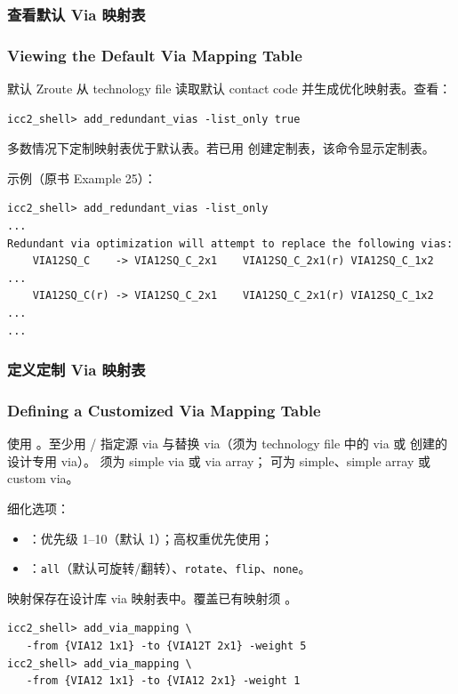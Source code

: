 \subsubsection{查看默认 Via 映射表}
\subsubsection*{Viewing the Default Via Mapping Table}

默认 Zroute 从 technology file 读取默认 contact code 并生成优化映射表。查看：
\begin{lstlisting}
icc2_shell> add_redundant_vias -list_only true
\end{lstlisting}
多数情况下定制映射表优于默认表。若已用  创建定制表，该命令显示定制表。

示例（原书 Example 25）：
\begin{lstlisting}
icc2_shell> add_redundant_vias -list_only
...
Redundant via optimization will attempt to replace the following vias:
    VIA12SQ_C    -> VIA12SQ_C_2x1    VIA12SQ_C_2x1(r) VIA12SQ_C_1x2 ...
    VIA12SQ_C(r) -> VIA12SQ_C_2x1    VIA12SQ_C_2x1(r) VIA12SQ_C_1x2 ...
...
\end{lstlisting}

\subsubsection{定义定制 Via 映射表}
\subsubsection*{Defining a Customized Via Mapping Table}

使用 。至少用 / 指定源 via 与替换 via（须为 technology file 中的 via 或  创建的设计专用 via）。 须为 simple via 或 via array； 可为 simple、simple array 或 custom via。

细化选项：
\begin{itemize}
  \item {}：优先级 1--10（默认 1）；高权重优先使用；
  \item {}：\texttt{all}（默认可旋转/翻转）、\texttt{rotate}、\texttt{flip}、\texttt{none}。
\end{itemize}

映射保存在设计库 via 映射表中。覆盖已有映射须 。

\begin{lstlisting}
icc2_shell> add_via_mapping \
   -from {VIA12 1x1} -to {VIA12T 2x1} -weight 5
icc2_shell> add_via_mapping \
   -from {VIA12 1x1} -to {VIA12 2x1} -weight 1
\end{lstlisting}


